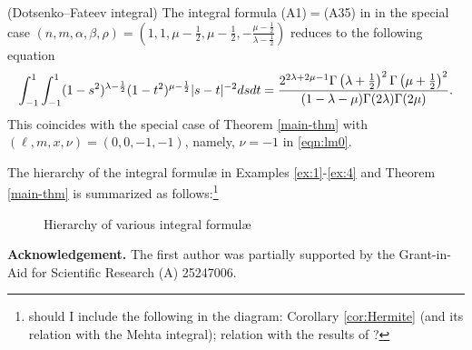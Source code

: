 \documentclass[12pt]{article}
\numberwithin{equation}{section}
\begin{document}
\begin{example}
  \label{ex:4}(Dotsenko--Fateev integral) The integral formula (A1)$=$(A35) in
  {\cite{dotsenko1985four}} in the special case $(n, m, \alpha, \beta, \rho) =
  \left( 1, 1, \mu - \frac{1}{2}, \mu - \frac{1}{2}, - \frac{\mu -
  \frac{1}{2}}{\lambda - \frac{1}{2}} \right)$ reduces to the following
  equation
  \begin{equation}
     \displaystyle\int_{- 1}^1 \displaystyle\displaystyle\int_{- 1}^1 (1 - s^2)^{\lambda
    - \frac{1}{2}} (1 - t^2)^{\mu - \frac{1}{2}} | s - t |^{- 2} d s d t
    = \frac{ 2^{2\lambda+2\mu-1} \Gamma \left( \lambda + \frac{1}{2} \right)^2 \Gamma \left(
    \mu + \frac{1}{2} \right)^2}{(1-\lambda - \mu ) \Gamma (2 \lambda) \Gamma
    (2 \mu)} .
    \label{eqn:spec_df}
  \end{equation}
  This coincides with the special case of Theorem \ref{main-thm} with $(\ell,
  m, x, \nu) = (0, 0, -1, - 1)$, namely, $\nu=-1$ in \eqref{eqn:lm0}.
\end{example}

The hierarchy of the integral formul{\ae} in Examples \ref{ex:1}-\ref{ex:4}
and Theorem \ref{main-thm} is summarized as follows:\footnote{should I include
the following in the diagram: Corollary \ref{cor:Hermite} (and its relation
with the Mehta integral); relation with the results of
{\cite{kobayashi2011schrodinger}}?}
\begin{figure}[h]
	
\caption{Hierarchy of various integral formul{\ae}\label{table}}
\end{figure}


{\bf Acknowledgement.} The first author was partially supported by the Grant-in-Aid for Scientific Research (A) 25247006.

\end{document}
